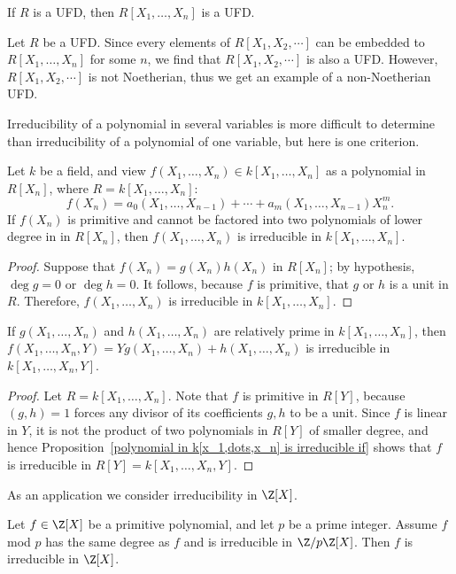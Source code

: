 \begin{corollary}
If $R$ is a UFD, then $R[X_1,\dots,X_n]$ is a UFD.
\end{corollary}
\begin{example}
Let $R$ be a UFD. Since every elements of $R[X_1,X_2,\cdots]$ can be embedded to $R[X_1,\dots,X_n]$ for some $n$, we find that $R[X_1,X_2,\cdots]$ is also a UFD. However, $R[X_1,X_2,\cdots]$ is not Noetherian, thus we get an example of a non-Noetherian UFD.
\end{example}
Irreducibility of a polynomial in several variables is more difficult to determine than irreducibility of a polynomial of one variable, but here is one criterion.
\begin{proposition}\label{polynomial in k[x_1,dots,x_n] is irreducible if}
Let $k$ be a field, and view $f(X_1,\dots,X_n)\in k[X_1,\dots,X_n]$ as
a polynomial in $R[X_n]$, where $R=k[X_1,\dots,X_n]$:
\[f(X_n)=a_0(X_1,\dots,X_{n-1})+\cdots+a_m(X_1,\dots,X_{n-1})X_n^m.\]
If $f(X_n)$ is primitive and cannot be factored into two polynomials of lower degree in in $R[X_n]$, then $f(X_1,\dots,X_n)$ is irreducible in $k[X_1,\dots,X_n]$.
\end{proposition}
\begin{proof}
Suppose that $f(X_n)=g(X_n)h(X_n)$ in $R[X_n]$; by hypothesis, $\deg g=0$ or $\deg h=0$. It follows, because $f$ is primitive, that $g$ or $h$ is a unit in $R$. Therefore, $f(X_1,\dots,X_n)$ is irreducible in $k[X_1,\dots,X_n]$.
\end{proof}
\begin{corollary}
If $g(X_1,\dots,X_n)$ and $h(X_1,\dots,X_n)$ are relatively prime in $k[X_1,\dots,X_n]$, then $f(X_1,\dots,X_n,Y)=Yg(X_1,\dots,X_n)+h(X_1,\dots,X_n)$ is irreducible in $k[X_1,\dots,X_n,Y]$.
\end{corollary}
\begin{proof}
Let $R=k[X_1,\dots,X_n]$. Note that $f$ is primitive in $R[Y]$, because $(g,h)=1$ forces any divisor of its coefficients $g,h$ to be a unit. Since $f$ is linear in $Y$, it is not the product of two polynomials in $R[Y]$ of smaller degree, and hence Proposition~\ref{polynomial in k[x_1,dots,x_n] is irreducible if} shows that $f$ is irreducible in $R[Y]=k[X_1,\dots,X_n,Y]$.
\end{proof}
As an application we consider irreducibility in $\Z[X]$.
\begin{proposition}\label{polynomial in Z irreducible if modulo by p}
Let $f\in\Z[X]$ be a primitive polynomial, and let $p$ be a prime integer. Assume $f$ mod $p$ has the same degree as $f$ and is irreducible in $\Z/p\Z[X]$. Then $f$ is irreducible in $\Z[X]$.
\end{proposition}
